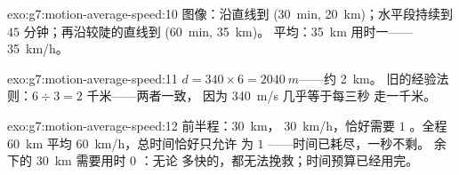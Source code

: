 \begin{solution}{exo:g7:motion-average-speed:10}
图像：沿直线到 (\qty{30}{min}, \qty{20}{km})；水平段持续到
$45$ 分钟；再沿较陡的直线到 (\qty{60}{min}, \qty{35}{km})。
平均：\qty{35}{km} 用时一——\qty{35}{km/h}。
\end{solution}

\begin{solution}{exo:g7:motion-average-speed:11}
$d = 340 \times 6 = \qty{2040}{m}$——约 \qty{2}{km}。
旧的经验法则：$6 \div 3 = 2$ 千米——两者一致，
因为 \qty{340}{m/s} 几乎等于每三秒
走一千米。
\end{solution}

\begin{solution}{exo:g7:motion-average-speed:12}
前半程：\qty{30}{km}， \qty{30}{km/h}，恰好需要 $1$
。全程 \qty{60}{km} 平均 \qty{60}{km/h}，总时间恰好只允许
为 $1$ ——时间已耗尽，一秒不剩。
余下的 \qty{30}{km} 需要用时 $0$ ：无论
多快的，都无法挽救；时间预算已经用完。
\end{solution}

